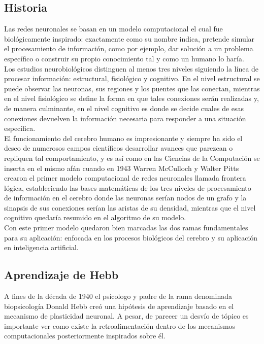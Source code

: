 \documentclass{llncs}
\begin{document}
\begin{multicols}{2}[]
\section{Historia}\label{sec:History}

Las redes neuronales se basan en un modelo computacional el cual fue biol\'ogicamente inspirado: exactamente como
su nombre indica, pretende simular el procesamiento de informaci\'on, como por ejemplo, dar soluci\'on a un problema
espec\'ifico o construir su propio conocimiento tal y como un humano lo har\'ia. \\

Los estudios neurobiol\'ogicos distinguen al menos tres niveles siguiendo la l\'inea de procesar informaci\'on: estructural,
fisiol\'ogico y cognitivo. En el nivel estructural se puede observar las neuronas, sus regiones y los puentes que las conectan,
mientras en el nivel fisiol\'ogico se define la forma en que tales conexiones ser\'an realizadas y, de manera culminante, en
el nivel cognitivo es donde se decide cuales de esas conexiones devuelven la informaci\'on necesaria para responder a una
situaci\'on espec\'ifica. \\

El funcionamiento del cerebro humano es impresionante y siempre ha sido el deseo de numerosos campos cient\'ificos
desarrollar avances que parezcan o repliquen tal comportamiento, y es as\'i como en las Ciencias de la Computaci\'on
se inserta en el mismo af\'an cuando en 1943 \cite{foundations} Warren McCulloch y Walter Pitts crearon el primer modelo computacional
de redes neuronales llamada frontera l\'ogica, estableciendo las bases matem\'aticas de los tres niveles de procesamiento
de informaci\'on en el cerebro donde las neuronas ser\'ian nodos de un grafo y la sinapsis de sus conexiones ser\'ian las
aristas de su densidad, mientras que el nivel cognitivo quedar\'ia resumido en el algoritmo de su mode\-lo. \\

Con este primer modelo quedaron bien marcadas las dos ramas fundamentales para su aplicaci\'on: enfocada en los
procesos biol\'ogicos del cerebro y su aplicaci\'on en inteligencia artificial. \\

\subsection{Aprendizaje de Hebb}

A fines de la d\'ecada de 1940 el ps\'icologo y padre de la rama denominada biopsicolog\'ia Donald Hebb cre\'o una hip\'otesis
de aprendizaje basado en el mecanismo de plasticidad neuronal. A pesar, de parecer un desv\'io de t\'opico es importante ver
como existe la retroalimentaci\'on dentro de los mecanismos computacionales posteriormente inspirados sobre \'el.\\


\end{multicols}
\end{document}
